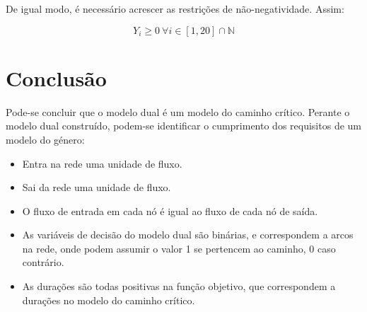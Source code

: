 De igual modo, é necessário acrescer as restrições de não-negatividade. Assim:

\begin{equation*}	
	Y_i \ge 0~\forall i \in {\left[ 1, 20 \right]\cap\mathbb{N}}
\end{equation*}


\section{Conclusão}

Pode-se concluir que o modelo dual é um modelo do caminho crítico. Perante
o modelo dual construído, podem-se identificar o cumprimento dos requisitos de
um modelo do género:

\begin{itemize}
	\item Entra na rede uma unidade de fluxo.
	\item Sai da rede uma unidade de fluxo.
	\item O fluxo de entrada em cada nó é igual ao fluxo de cada nó de saída.
	\item As variáveis de decisão do modelo dual são binárias, e correspondem
		a arcos na rede, onde podem assumir o valor 1 se pertencem ao caminho,
		0 caso contrário.
	\item As durações são todas positivas na função objetivo, que correspondem
		a durações no modelo do caminho crítico.
\end{itemize}


